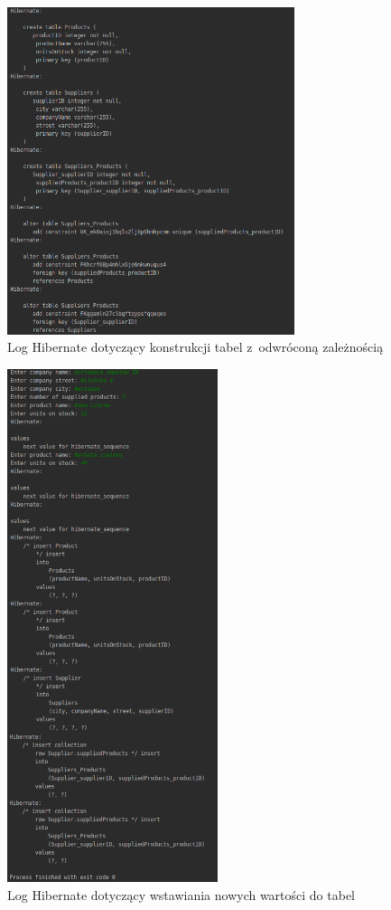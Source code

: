 \documentclass[12pt, a4paper]{mwart}
\begin{document}
\begin{figure}[ht]
  \centering
  \includegraphics[width=0.75\textwidth]{IV/4-1.png}
  \caption{Log Hibernate dotyczący konstrukcji tabel z~odwróconą zależnością}
  \label{rys:4.1}
\end{figure}

\begin{figure}[ht]
  \centering
  \includegraphics[width=0.55\textwidth]{IV/4-2.png}
  \caption{Log Hibernate dotyczący wstawiania nowych wartości do tabel}
  \label{rys:4.2}
\end{figure}
\end{document}
